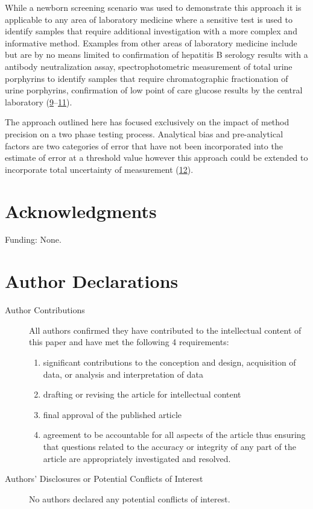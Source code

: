 \documentclass[review]{elsarticle}
\begin{document}
While a newborn screening scenario was used to demonstrate this
approach it is applicable to any area of laboratory medicine where a
sensitive test is used to identify samples that require additional
investigation with a more complex and informative method. Examples
from other areas of laboratory medicine include but are by no means
limited to confirmation of hepatitis B serology results with a
antibody neutralization assay, spectrophotometric measurement of total
urine porphyrins to identify samples that require chromatographic
fractionation of urine porphyrins, confirmation of low point of care
glucose results by the central laboratory (\hyperlink{citeproc_bib_item_9}{9}–\hyperlink{citeproc_bib_item_11}{11}).

The approach outlined here has focused exclusively on the impact of
method precision on a two phase testing process. Analytical bias and
pre-analytical factors are two categories of error that have not been
incorporated into the estimate of error at a threshold value however
this approach could be extended to incorporate total uncertainty of
measurement (\hyperlink{citeproc_bib_item_12}{12}).

\section*{Acknowledgments}
\label{sec:org8169859}
Funding: None.
\section*{Author Declarations}
\label{sec:org9c49665}
\begin{description}
\item[{Author Contributions}] All authors confirmed they have contributed
to the intellectual content of this paper and have met the following
4 requirements:
\begin{enumerate}
\item significant contributions to the conception and design, acquisition of data, or analysis and interpretation of data
\item drafting or revising the article for intellectual content
\item final approval of the published article
\item agreement to be accountable for all aspects of the article thus
ensuring that questions related to the accuracy or integrity of
any part of the article are appropriately investigated and
resolved.
\end{enumerate}

\item[{Authors’ Disclosures or Potential Conflicts of Interest}] No authors declared any potential conflicts of interest.
\end{description}
\end{document}

